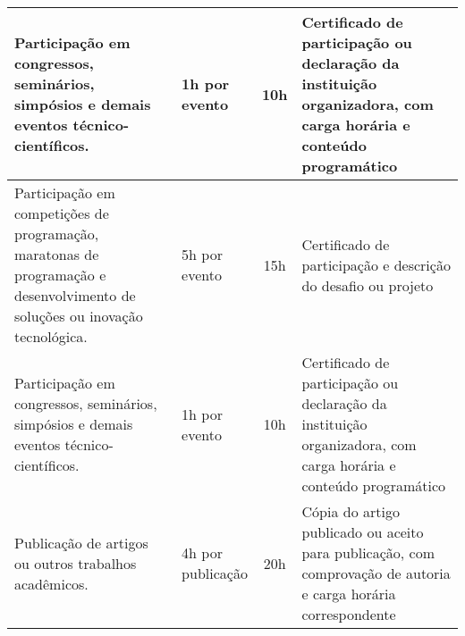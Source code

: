 \begin{small}
\begin{longtable}{m{5.6cm}m{2cm}c m{6.2cm}}
        \hline
        Participação em congressos, seminários, simpósios e demais eventos técnico-científicos.                                     & \parbox[t]{2cm}{\centering 1h por  \\evento}\vspace{4pt}& 10h &Certificado de participação ou declaração da instituição organizadora, com carga horária e conteúdo programático      \\
        \hline
        Participação em competições de programação, maratonas de programação e desenvolvimento de soluções ou inovação tecnológica. & \parbox[t]{2cm}{\centering 5h por  \\evento}\vspace{4pt}& 15h &  Certificado de participação e descrição do desafio ou projeto                                                                                                           \\
        \hline
        Participação em congressos, seminários, simpósios e demais eventos técnico-científicos.                                     & \parbox[t]{2cm}{\centering 1h por  \\evento}\vspace{4pt}& 10h &Certificado de participação ou declaração da instituição organizadora, com carga horária e conteúdo programático      \\
        \hline
        Publicação de artigos ou outros trabalhos acadêmicos.
                                                                                                                                    & \parbox[t]{2cm}{\centering 4h por  \\publicação}\vspace{4pt}& 20h & Cópia do artigo publicado ou aceito para publicação, com comprovação de autoria e carga horária correspondente        \\
        \hline


\end{longtable}
\end{small}
